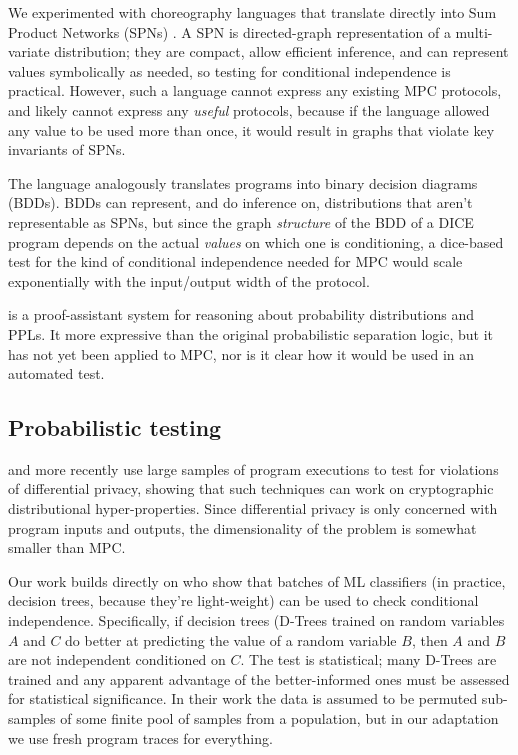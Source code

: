 \documentclass[conference]{IEEEtran}
\begin{document}
We experimented with choreography languages that translate directly into Sum Product Networks (SPNs) \cite{TODO}.
A SPN is directed-graph representation of a multi-variate distribution;
they are compact, allow efficient inference, and can represent values symbolically as needed,
so testing for conditional independence is practical.
However, such a language cannot express any existing MPC protocols, and likely cannot express any \textit{useful} protocols,
because if the language allowed any value to be used more than once, it would result in graphs that violate key invariants of SPNs.

The \cite{DICE} language analogously translates programs into binary decision diagrams (BDDs).
BDDs can represent, and do inference on, distributions that aren't representable as SPNs,
but since the graph \textit{structure} of the BDD of a DICE program depends on the actual \textit{values} on which one is conditioning,
a dice-based test for the kind of conditional independence needed for MPC would scale exponentially with the input/output width of the protocol.

\cite{lilac} %
is a proof-assistant system for reasoning about probability distributions and PPLs.
It more expressive than the original probabilistic separation logic,
but it has not yet been applied to MPC, nor is it clear how it would be used in an automated test.

\subsection{Probabilistic testing}

\cite{Kifer} %
and more recently \cite{Zhang et al} %
use large samples of program executions to test for violations of differential privacy,
showing that such techniques can work on cryptographic distributional hyper-properties.
Since differential privacy is only concerned with program inputs and outputs,
the dimensionality of the problem is somewhat smaller than MPC.

Our work builds directly on \cite{decision trees paper} %
who show that batches of ML classifiers (in practice, decision trees, because they're light-weight) can be used to check conditional independence.
Specifically, if decision trees (D-Trees trained on random variables $A$ and $C$ do better at predicting the value of a random variable $B$,
then $A$ and $B$ are not independent conditioned on $C$.
The test is statistical; many D-Trees are trained and any apparent advantage of the better-informed ones must be assessed for statistical significance.
In their work the data is assumed to be permuted sub-samples of some finite pool of samples from a population,
but in our adaptation we use fresh program traces for everything.
\end{document}
